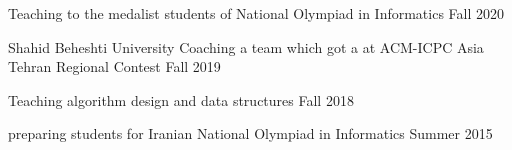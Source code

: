 \begin{cvtas}

  \cvta
    {} %
    {Teaching to the medalist students of National Olympiad in Informatics} %
    {Fall 2020} %
    {} %

  \cvta
    {Shahid Beheshti University} %
    {Coaching a team which got a  at ACM-ICPC Asia Tehran Regional Contest}
    {Fall 2019} %
    {} %

  \cvta
    {} %
    {Teaching algorithm design and data structures}
    {Fall 2018} %
    {} %





  \cvta
    {} %
    {preparing students for Iranian National Olympiad in Informatics} %
    {Summer 2015} %
    {} %

\end{cvtas}